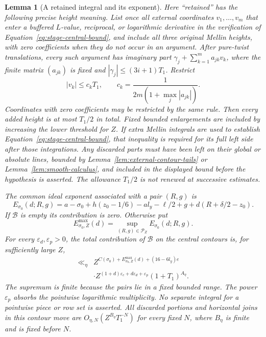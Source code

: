 \documentclass[11pt,a4paper]{article}
\numberwithin{equation}{section}
\numberwithin{figure}{section}
\newtheorem{lemma}[theorem]{Lemma}
\theoremstyle{definition}
\theoremstyle{remark}
\begin{document}
\begin{lemma}[A retained integral and its exponent]
Here ``retained'' has the following precise height meaning.  List once all
external coordinates $v_1,\ldots,v_m$ that enter a buffered $L$-value,
reciprocal, or logarithmic derivative in the verification of
Equation~\eqref{eq:stage-central-bound}, and include all three original
Mellin heights, with zero coefficients when they do not occur in an
argument.  After pure-twist translations, every such argument
has imaginary part
$\gamma_j+\sum_{k=1}^m a_{jk}v_k$, where the finite matrix $(a_{jk})$ is
fixed and $|\gamma_j|\le(3i+1)T_1$.  Restrict
\begin{equation}
 |v_k|\le c_kT_1,\qquad
 c_k=\frac1{2m(1+\max_j|a_{jk}|)}.
 \label{eq:stage-height-allocation}
\end{equation}
Coordinates with zero coefficients may be restricted by the same rule.
Then every added height is at most $T_1/2$ in total.  Fixed bounded
enlargements are included by increasing the lower threshold for $Z$.
If extra Mellin integrals are used to establish
Equation~\eqref{eq:stage-central-bound}, that inequality is required for
its full left side after those integrations.  Any discarded parts must have
been left on their global or absolute lines, bounded by
Lemma~\ref{lem:external-contour-tails} or
Lemma~\ref{lem:smooth-calculus}, and included in the displayed bound before
the hypothesis is asserted.  The allowance $T_1/2$ is not renewed at
successive estimates.

The common ideal exponent associated with a pair $(R,g)$ is
\begin{equation}
 E_{\sigma_0}(d;R,g)=a-\sigma_0+h(z_0-1/6)-a l_y-\ell/2+g
                  +d(R+\delta/2-z_0).
 \label{eq:stage-high-exponent}
\end{equation}
If $\mathcal B$ is empty its contribution is zero.  Otherwise put
\[
 E^{\max}_{\sigma_0,Z}(d)
   =\sup_{(R,g)\in\mathcal P_Z}E_{\sigma_0}(d;R,g).
\]
For every $\varepsilon_d,\varepsilon_p>0$, the total contribution of
$\mathcal B$ on the central contours is, for sufficiently large $Z$,
\begin{equation}
 \begin{split}
 \ll_\eta{}& Z^{C(\sigma_0)+E^{\max}_{\sigma_0,Z}(d)+(16-6l_y)e}\\
 &\cdot Z^{(1+d)\varepsilon_c+d\varepsilon_d+\varepsilon_p}
       (1+T_1)^{A_\eta}.
 \end{split}
 \label{eq:stage-central-contribution}
\end{equation}
The supremum is finite because the pairs lie in a fixed bounded range.
The power $\varepsilon_p$ absorbs the pointwise logarithmic multiplicity.
No separate integral for a pointwise piece or row set is asserted.
All discarded portions and horizontal joins in this contour move are
$O_{\eta,N}(Z^{B_\eta}T_1^{-N})$ for every fixed $N$, where $B_\eta$ is
finite and is fixed before $N$.
\end{lemma}
\end{document}
